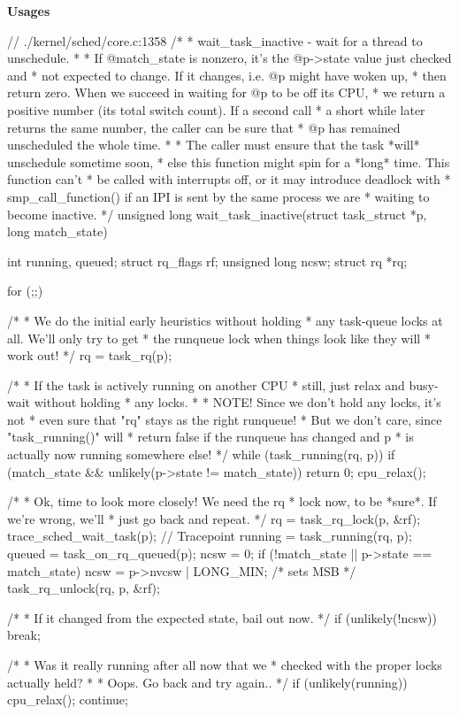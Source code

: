 \textbf{Usages}
\begin{code}
// ./kernel/sched/core.c:1358
/*
 * wait_task_inactive - wait for a thread to unschedule.
 *
 * If @match_state is nonzero, it's the @p->state value just checked and
 * not expected to change.  If it changes, i.e. @p might have woken up,
 * then return zero.  When we succeed in waiting for @p to be off its CPU,
 * we return a positive number (its total switch count).  If a second call
 * a short while later returns the same number, the caller can be sure that
 * @p has remained unscheduled the whole time.
 *
 * The caller must ensure that the task *will* unschedule sometime soon,
 * else this function might spin for a *long* time. This function can't
 * be called with interrupts off, or it may introduce deadlock with
 * smp_call_function() if an IPI is sent by the same process we are
 * waiting to become inactive.
 */
unsigned long wait_task_inactive(struct task_struct *p, long match_state){
	int running, queued;
	struct rq_flags rf;
	unsigned long ncsw;
	struct rq *rq;

	for (;;) {
		/*
		 * We do the initial early heuristics without holding
		 * any task-queue locks at all. We'll only try to get
		 * the runqueue lock when things look like they will
		 * work out!
		 */
		rq = task_rq(p);

		/*
		 * If the task is actively running on another CPU
		 * still, just relax and busy-wait without holding
		 * any locks.
		 *
		 * NOTE! Since we don't hold any locks, it's not
		 * even sure that "rq" stays as the right runqueue!
		 * But we don't care, since "task_running()" will
		 * return false if the runqueue has changed and p
		 * is actually now running somewhere else!
		 */
		while (task_running(rq, p)) {
			if (match_state && unlikely(p->state != match_state))
				return 0;
			cpu_relax();
		}

		/*
		 * Ok, time to look more closely! We need the rq
		 * lock now, to be *sure*. If we're wrong, we'll
		 * just go back and repeat.
		 */
		rq = task_rq_lock(p, &rf);
		trace_sched_wait_task(p); // Tracepoint
		running = task_running(rq, p);
		queued = task_on_rq_queued(p);
		ncsw = 0;
		if (!match_state || p->state == match_state)
			ncsw = p->nvcsw | LONG_MIN; /* sets MSB */
		task_rq_unlock(rq, p, &rf);

		/*
		 * If it changed from the expected state, bail out now.
		 */
		if (unlikely(!ncsw))
			break;

		/*
		 * Was it really running after all now that we
		 * checked with the proper locks actually held?
		 *
		 * Oops. Go back and try again..
		 */
		if (unlikely(running)) {
			cpu_relax();
			continue;
		}

}}
\end{code}
